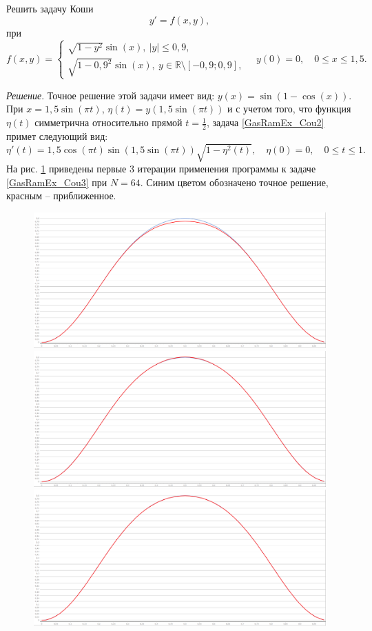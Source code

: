 \begin{example}
Решить задачу Коши
\begin{equation}\label{GasRamEx_Cou2}
y'=f(x,y),
\end{equation}
при
\begin{equation*}
f(x,y)=
\begin{cases}
\sqrt{1-y^2}\sin(x),\ |y|\leq 0,9,\\
\sqrt{1-0,9^2}\sin(x),\ y\in\mathbb{R}\setminus[-0,9;0,9],
\end{cases}
\quad y(0)=0, \quad 0\leq x\leq 1,5.
\end{equation*}
\end{example}
\textit{ Решение}. Точное решение этой задачи имеет вид: $y(x)=\sin(1-\cos(x))$. При $x=1,5\sin(\pi t)$, $\eta(t)=y(1,5\sin(\pi t))$ и с учетом того, что функция $\eta(t)$ симметрична относительно прямой $t=\frac12$, задача \eqref{GasRamEx_Cou2} примет следующий вид:
\begin{equation}\label{GasRamEx_Cou3}
\eta'(t)=1,5\cos(\pi t) \sin(1,5\sin(\pi t)) \sqrt{1-\eta^2(t)}, \quad \eta(0)=0, \quad 0\leq t\leq 1.
\end{equation}
На рис. \ref{pic2} приведены первые 3 итерации применения программы к задаче \eqref{GasRamEx_Cou3} при $N=64$. Синим цветом обозначено точное решение, красным -- приближенное.
\begin{figure}
\includegraphics[width=.32\linewidth]{pictures/Ex2_image1_64(1)}
\includegraphics[width=.32\linewidth]{pictures/Ex2_image1_64(2)}
\includegraphics[width=.32\linewidth]{pictures/Ex2_image1_64(3)}
\caption{}
\label{pic2}
\end{figure}









